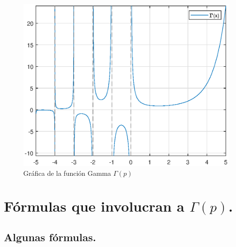 \begin{figure}[H]
   \centering
   \includegraphics[scale=0.75]{Imagenes/Plot_Gamma.eps}
   \caption{Gráfica de la función Gamma $\Gamma (p)$}
   \label{fig:figura_plot_gamma}
\end{figure}

\section{Fórmulas que involucran a \texorpdfstring{$\Gamma (p)$}{G (p)}.}

\subsection{Algunas fórmulas.}

